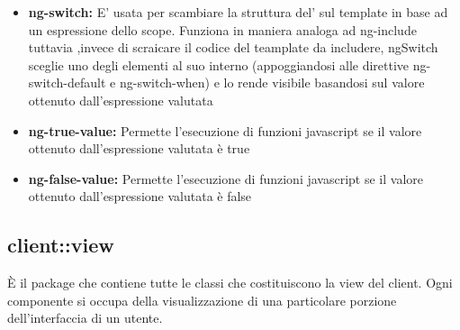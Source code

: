 \begin{itemize}
	\item \textbf{ng-switch:} E' usata per scambiare la struttura del' sul template  in base ad un espressione dello scope. Funziona in maniera analoga ad ng-include tuttavia ,invece di scraicare il codice del teamplate  da includere, ngSwitch sceglie uno degli elementi al suo interno (appoggiandosi alle direttive ng-switch-default e ng-switch-when) e lo rende visibile basandosi sul valore ottenuto dall'espressione valutata
	\item \textbf{ng-true-value:} Permette l'esecuzione di funzioni javascript se il valore ottenuto dall'espressione valutata è true
	\item \textbf{ng-false-value:} Permette l'esecuzione di funzioni javascript se il valore ottenuto dall'espressione valutata è false
	\end{itemize}

\subsection{client::view}
È il package che contiene tutte le classi che costituiscono la view del client. 
Ogni componente si occupa della visualizzazione di una particolare porzione dell'interfaccia di un utente.

